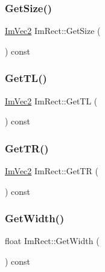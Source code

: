 \mbox{\label{structImRect_ae459d9c50003058cfb34519a571aaf33}} 
\subsubsection{\texorpdfstring{Get\+Size()}{GetSize()}}
{\footnotesize\ttfamily \hyperlink{structImVec2}{Im\+Vec2} Im\+Rect\+::\+Get\+Size (\begin{DoxyParamCaption}{ }\end{DoxyParamCaption}) const\hspace{0.3cm}{\ttfamily [inline]}}

\mbox{\label{structImRect_a1d4d972329722b51dca4499cb5931b4b}} 
\subsubsection{\texorpdfstring{Get\+T\+L()}{GetTL()}}
{\footnotesize\ttfamily \hyperlink{structImVec2}{Im\+Vec2} Im\+Rect\+::\+Get\+TL (\begin{DoxyParamCaption}{ }\end{DoxyParamCaption}) const\hspace{0.3cm}{\ttfamily [inline]}}

\mbox{\label{structImRect_acae90248a96be4acf1524071fca1c3f3}} 
\subsubsection{\texorpdfstring{Get\+T\+R()}{GetTR()}}
{\footnotesize\ttfamily \hyperlink{structImVec2}{Im\+Vec2} Im\+Rect\+::\+Get\+TR (\begin{DoxyParamCaption}{ }\end{DoxyParamCaption}) const\hspace{0.3cm}{\ttfamily [inline]}}

\mbox{\label{structImRect_afa75cb8491f20901c96166d17dcddac4}} 
\subsubsection{\texorpdfstring{Get\+Width()}{GetWidth()}}
{\footnotesize\ttfamily float Im\+Rect\+::\+Get\+Width (\begin{DoxyParamCaption}{ }\end{DoxyParamCaption}) const\hspace{0.3cm}{\ttfamily [inline]}}

